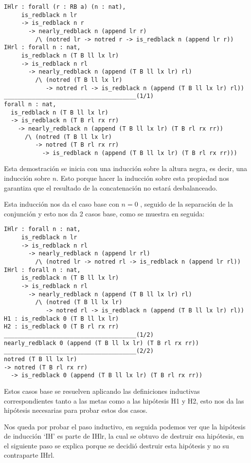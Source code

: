 \begin{verbatim}
IHlr : forall (r : RB a) (n : nat),
     is_redblack n lr
     -> is_redblack n r
       -> nearly_redblack n (append lr r)
         /\ (notred lr -> notred r -> is_redblack n (append lr r))
IHrl : forall n : nat,
     is_redblack n (T B ll lx lr)
     -> is_redblack n rl
       -> nearly_redblack n (append (T B ll lx lr) rl)
         /\ (notred (T B ll lx lr)
            -> notred rl -> is_redblack n (append (T B ll lx lr) rl))
______________________________________(1/1)
forall n : nat,
  is_redblack n (T B ll lx lr)
  -> is_redblack n (T B rl rx rr)
    -> nearly_redblack n (append (T B ll lx lr) (T B rl rx rr))
      /\ (notred (T B ll lx lr)
         -> notred (T B rl rx rr)
           -> is_redblack n (append (T B ll lx lr) (T B rl rx rr)))
\end{verbatim}

Esta demostraci\'on se inicia con una inducci\'on sobre la altura negra, es decir, una inducción 
sobre $n$. Esto porque hacer la inducción sobre esta propiedad nos garantiza que el resultado de la 
concatenación no estará desbalanceado.

Esta inducci\'on nos da el caso base con $n=0$
, seguido de la separaci\'on de la conjunci\'on y esto nos da 2 casos base, como se muestra en
seguida:

\begin{verbatim}
IHlr : forall n : nat,
     is_redblack n lr
     -> is_redblack n rl
       -> nearly_redblack n (append lr rl)
         /\ (notred lr -> notred rl -> is_redblack n (append lr rl))
IHrl : forall n : nat,
     is_redblack n (T B ll lx lr)
     -> is_redblack n rl
       -> nearly_redblack n (append (T B ll lx lr) rl)
         /\ (notred (T B ll lx lr)
            -> notred rl -> is_redblack n (append (T B ll lx lr) rl))
H1 : is_redblack 0 (T B ll lx lr)
H2 : is_redblack 0 (T B rl rx rr)
______________________________________(1/2)
nearly_redblack 0 (append (T B ll lx lr) (T B rl rx rr))
______________________________________(2/2)
notred (T B ll lx lr)
-> notred (T B rl rx rr)
  -> is_redblack 0 (append (T B ll lx lr) (T B rl rx rr))
\end{verbatim}

Estos casos base se resuelven aplicando las definiciones inductivas correspondientes tanto a las
metas como a las hip\'otesis H1 y H2, esto nos da las hipótesis necesarias para probar estos dos
casos.

Nos queda por probar el paso inductivo, en seguida podemos ver que la hipótesis de inducci\'on
`IH' es parte de IHlr, la cual se obtuvo de destruir esa hipótesis, en el siguiente paso se explica 
porque se decidió destruir esta hip\'otesis y no su contraparte IHrl.

